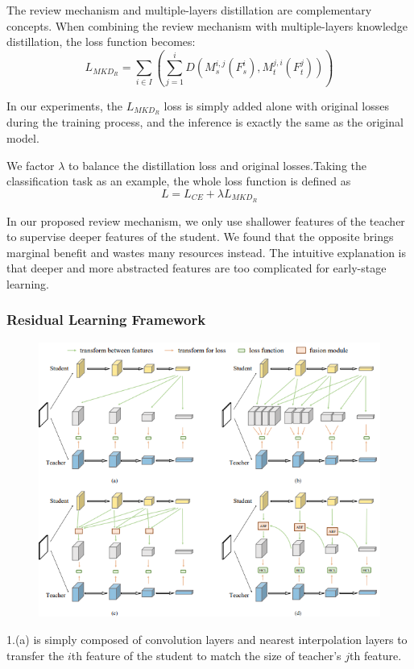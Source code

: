 \documentclass[11pt]{article}
\begin{document}
The review mechanism and multiple-layers distillation are complementary concepts. When combining the review mechanism with multiple-layers knowledge distillation, the
loss function becomes:
$$L_{MKD_R} = \sum_{i\in I}(\sum_{j=1}^{i}D(M_s^{i,j}(F_s^i),M_t^{j,i}(F_t^j)))$$

In our experiments, the $L_{MKD_R}$ loss is simply added alone with original losses during the training process, and the inference is exactly the same as the original model.

We factor $\lambda$ to balance the distillation loss and original losses.Taking the classification task as an example, the whole loss function is defined as $$L = L_{CE} + \lambda L_{MKD_R}$$

In our proposed review mechanism, we only use shallower features of the teacher to supervise deeper features of the student. We found that the opposite brings marginal benefit and wastes many resources instead. The intuitive explanation is that deeper and more abstracted features are too complicated for early-stage learning.

\subsubsection{Residual Learning Framework}
\begin{figure}[H]
	\centering
	\includegraphics[scale = 0.65]{100}
\end{figure}

1.(a) is simply composed of convolution layers and nearest interpolation layers to transfer the $i$th feature of the student to match the size of teacher’s $j$th feature.
\end{document}
